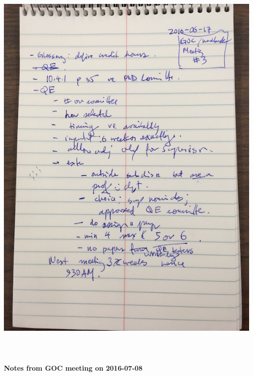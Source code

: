 \documentclass[12pt]{article}
\begin{document}
\includegraphics[height=8in]{meetings/20160617/20160617_meeting_notes.jpg}

\newpage
\textbf{\large Notes from GOC meeting on 2016-07-08} \label{mn:20160708}
\end{document}
